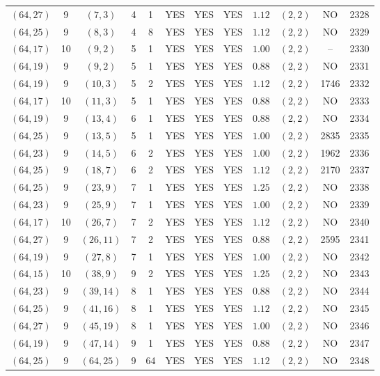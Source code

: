 \begin{longtable}{|c|c|c|c|c|c|c|c|c|c|c|c|}
$(64,27)$ & 9 & $(7,3)$ & 4 & 1 & YES & YES & YES & $1.12$ & $(2,2)$ & NO & 2328\\
$(64,25)$ & 9 & $(8,3)$ & 4 & 8 & YES & YES & YES & $1.12$ & $(2,2)$ & NO & 2329\\
$(64,17)$ & 10 & $(9,2)$ & 5 & 1 & YES & YES & YES & $1.00$ & $(2,2)$ & -- & 2330\\
$(64,19)$ & 9 & $(9,2)$ & 5 & 1 & YES & YES & YES & $0.88$ & $(2,2)$ & NO & 2331\\
$(64,19)$ & 9 & $(10,3)$ & 5 & 2 & YES & YES & YES & $1.12$ & $(2,2)$ & 1746 & 2332\\
$(64,17)$ & 10 & $(11,3)$ & 5 & 1 & YES & YES & YES & $0.88$ & $(2,2)$ & NO & 2333\\
$(64,19)$ & 9 & $(13,4)$ & 6 & 1 & YES & YES & YES & $0.88$ & $(2,2)$ & NO & 2334\\
$(64,25)$ & 9 & $(13,5)$ & 5 & 1 & YES & YES & YES & $1.00$ & $(2,2)$ & 2835 & 2335\\
$(64,23)$ & 9 & $(14,5)$ & 6 & 2 & YES & YES & YES & $1.00$ & $(2,2)$ & 1962 & 2336\\
$(64,25)$ & 9 & $(18,7)$ & 6 & 2 & YES & YES & YES & $1.12$ & $(2,2)$ & 2170 & 2337\\
$(64,25)$ & 9 & $(23,9)$ & 7 & 1 & YES & YES & YES & $1.25$ & $(2,2)$ & NO & 2338\\
$(64,23)$ & 9 & $(25,9)$ & 7 & 1 & YES & YES & YES & $1.00$ & $(2,2)$ & NO & 2339\\
$(64,17)$ & 10 & $(26,7)$ & 7 & 2 & YES & YES & YES & $1.12$ & $(2,2)$ & NO & 2340\\
$(64,27)$ & 9 & $(26,11)$ & 7 & 2 & YES & YES & YES & $0.88$ & $(2,2)$ & 2595 & 2341\\
$(64,19)$ & 9 & $(27,8)$ & 7 & 1 & YES & YES & YES & $1.00$ & $(2,2)$ & NO & 2342\\
$(64,15)$ & 10 & $(38,9)$ & 9 & 2 & YES & YES & YES & $1.25$ & $(2,2)$ & NO & 2343\\
$(64,23)$ & 9 & $(39,14)$ & 8 & 1 & YES & YES & YES & $0.88$ & $(2,2)$ & NO & 2344\\
$(64,25)$ & 9 & $(41,16)$ & 8 & 1 & YES & YES & YES & $1.12$ & $(2,2)$ & NO & 2345\\
$(64,27)$ & 9 & $(45,19)$ & 8 & 1 & YES & YES & YES & $1.00$ & $(2,2)$ & NO & 2346\\
$(64,19)$ & 9 & $(47,14)$ & 9 & 1 & YES & YES & YES & $0.88$ & $(2,2)$ & NO & 2347\\
$(64,25)$ & 9 & $(64,25)$ & 9 & 64 & YES & YES & YES & $1.12$ & $(2,2)$ & NO & 2348\\

\end{longtable}
